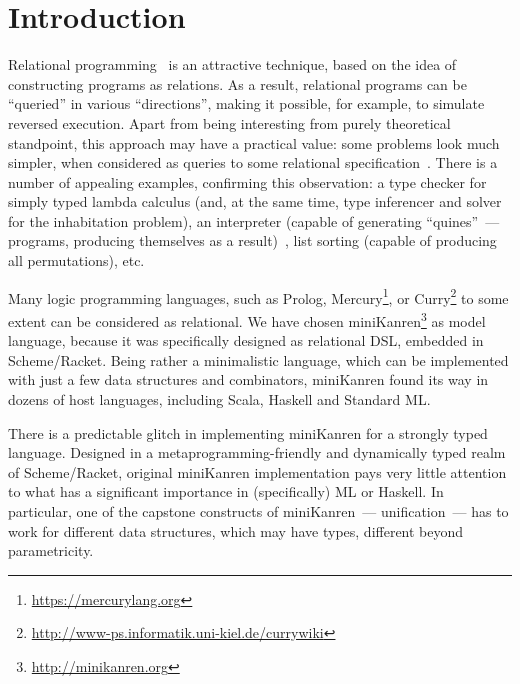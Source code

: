 \section{Introduction}
\label{intro}

Relational programming~\cite{TRS} is an attractive technique, based on the idea 
of constructing programs as relations.  As a result, relational programs can be
``queried'' in various ``directions'', making it possible, for example, to simulate
reversed execution. Apart from being interesting from purely theoretical standpoint, 
this approach may have a practical value: some problems look much simpler, 
when considered as queries to some relational specification~\cite{WillThesis}. There is a 
number of appealing examples, confirming this observation: a type checker 
for simply typed lambda calculus (and, at the same time, type inferencer and solver 
for the inhabitation problem), an interpreter (capable of generating ``quines''~--- 
programs, producing themselves as a result)~\cite{Untagged}, list sorting (capable of 
producing all permutations), etc. 

Many logic programming languages, such as Prolog, Mercury\footnote{\url{https://mercurylang.org}}, 
or Curry\footnote{\url{http://www-ps.informatik.uni-kiel.de/currywiki}} to some extent
can be considered as relational. We have chosen miniKanren\footnote{\url{http://minikanren.org}} 
as model language, because it was specifically designed as relational DSL, embedded in Scheme/Racket. 
Being rather a minimalistic language, which can be implemented with just a few data structures and
combinators, miniKanren found its way in dozens of host languages, including Scala, Haskell and Standard ML.

There is a predictable glitch in implementing miniKanren for a strongly typed language. 
Designed in a metaprogramming-friendly and dynamically typed realm of Scheme/Racket, original 
miniKanren implementation pays very little attention to what has a significant importance in (specifically) 
ML or Haskell. In particular, one of the capstone constructs of miniKanren~--- unification~--- has to work for 
different data structures, which may have types, different beyond parametricity.

